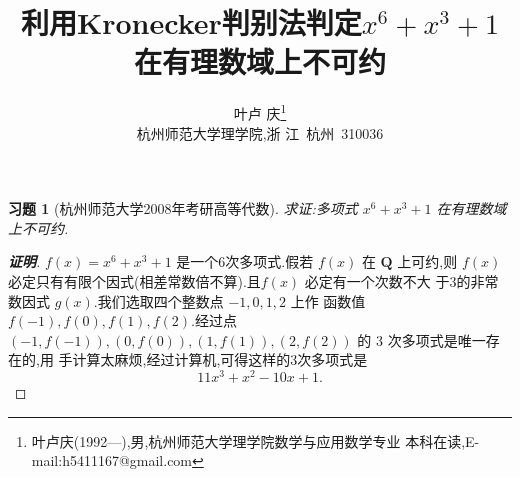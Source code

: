 \documentclass[twoside,11pt]{article}
\newtheorem*{exercise}{习题}
\begin{document}
\title{\huge{\bf{利用Kronecker判别法判定$x^6+x^3+1$在有理数域上不可约}}} \author{\small{叶卢
    庆\footnote{叶卢庆(1992---),男,杭州师范大学理学院数学与应用数学专业
      本科在读,E-mail:h5411167@gmail.com}}\\{\small{杭州师范大学理学院,浙
      江~杭州~310036}}} \date{}
\maketitle


\vspace{30pt} %
\begin{exercise}[杭州师范大学2008年考研高等代数]
  求证:多项式 $x^6+x^3+1$ 在有理数域上不可约.
\end{exercise}
\begin{proof}[\textbf{证明}]
$f(x)=x^6+x^3+1$ 是一个6次多项式.假若 $f(x)$ 在 $\mathbf{Q}$ 上可约,则
$f(x)$ 必定只有有限个因式(相差常数倍不算).且$f(x)$ 必定有一个次数不大
于3的非常数因式 $g(x)$.我们选取四个整数点 $-1,0,1,2$ 上作
函数值 $f(-1),f(0),f(1),f(2)$.经过点
$(-1,f(-1)),(0,f(0)),(1,f(1)),(2,f(2))$ 的 $3$ 次多项式是唯一存在的,用
手计算太麻烦,经过计算机,可得这样的3次多项式是
$$
11 x^3+x^2-10 x+1.
$$

\end{proof}

% 
\end{document}
